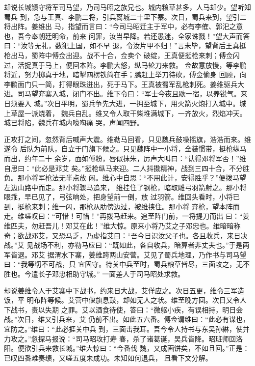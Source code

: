 却说长城镇守将军司马望，乃司马昭之族兄也。城内粮草甚多，人马却少。望听知蜀兵
到，急与王真、李鹏二将，引兵离城二十里下寨。次日，蜀兵来到，望引二将出阵。姜维出
马，指望而言曰：“今司马昭迁主于军中，必有李傕、郭汜之意也，吾今奉朝廷明命，前来
问罪，汝当早降。若还愚迷，全家诛戮！”望大声而答曰：“汝等无礼，数犯上国，如不早
退，令汝片甲不归！”言未毕，望背后王真挺枪出马，蜀阵中傅佥出迎。战不十合，佥卖个
破绽，王真便挺枪来刺；傅佥闪过，活捉真于马上，便回本阵。李鹏大怒，纵马轮刀来救。
佥故意放慢，等李鹏将近，努力掷真于地，暗掣四楞铁简在手；鹏赶上举刀待砍，傅佥偷身
回顾，向李鹏面门只一简，打得眼珠迸出，死于马下。王真被蜀军乱枪刺死。姜维驱兵大
进。司马望弃寨入城，闭门不出。维下令曰：“军士今夜且歇一宿，以养锐气。来日须要入
城。”次日平明，蜀兵争先大进，一拥至城下，用火箭火炮打入城中。城上草屋一派烧着，
魏兵自乱。维又令人取干柴堆满城下，一齐放火，烈焰冲天。城已将陷，魏兵在城内嚎啕痛
哭，声闻四野。

正攻打之间，忽然背后喊声大震。维勒马回看，只见魏兵鼓噪摇旗，浩浩而来。维遂令
后队为前队，自立于门旗下候之。只见魏阵中一小将，全装惯带，挺枪纵马而出，约年二十
余岁，面如傅粉，唇似抹朱，厉声大叫曰：“认得邓将军否！”维自思曰：“此必是邓艾
矣。”挺枪纵马来迎。二人抖擞精神，战到三四十合，不分胜负。那小将军枪法无半点放
闲。维心中自思：“不用此计，安得胜乎？”便拨马望左边山路中而走。那小将骤马追来，
维挂住了钢枪，暗取雕弓羽箭射之。那小将眼乖，早已见了，弓弦响处，把身望前一倒，放
过羽箭。维回头看时，小将已到，挺枪来刺；维一闪，那枪从肋傍边过，被维挟住。那小将
弃枪，望本阵而走。维嗟叹曰：“可惜！可惜！”再拨马赶来。追至阵门前，一将提刀而出
曰：“姜维匹夫，勿赶吾儿！邓艾在此！”维大惊。原来小将乃艾之子邓忠也。维暗暗称
奇；欲战邓艾，又恐马乏，乃虚指艾曰：“吾今日识汝父子也。各且收兵，来日决战。”艾
见战场不利，亦勒马应曰：“既如此，各自收兵，暗算者非丈夫也。”于是两军皆退。邓艾
据渭水下寨，姜维跨两山安营。艾见了蜀兵地理，乃作书与司马望曰：“我等切不可战，只
宜固守。待关中兵至时，蜀兵粮草皆尽，三面攻之，无不胜也。今遣长子邓忠相助守城。”
一面差人于司马昭处求救。

却说姜维令人于艾寨中下战书，约来日大战，艾佯应之。次日五更，维令三军造饭，平
明布阵等候。艾营中偃旗息鼓，却如无人之状。维至晚方回。次日又令人下战书，责以失期
之罪。艾以酒食待使，答曰：“微躯小疾，有误相持，明日会战。”次日，维又引兵来，艾
仍前不出。如此五六番。傅佥谓维曰：“此必有谋也，宜防之。”维曰：“此必捱关中兵
到，三面击我耳。吾今令人持书与东吴孙綝，使并力攻之。”忽探马报说：“司马昭攻打寿
春，杀了诸葛诞，吴兵皆降。昭班师回洛阳。便欲引兵来救长城。”维大惊曰：“今番伐
魏，又成画饼矣，不如且回。”正是：已叹四番难奏绩，又嗟五度未成功。未知如何退兵，
且看下文分解。